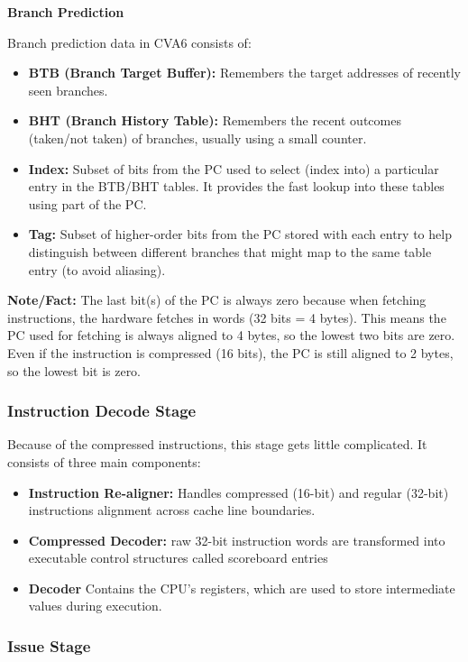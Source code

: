 \documentclass[12pt, a4paper]{article}
\begin{document}
\vspace{0.5em}

\textbf{Branch Prediction}

Branch prediction data in CVA6 consists of:
\begin{itemize}[nosep]
    \item \textbf{BTB (Branch Target Buffer):} Remembers the target addresses of recently seen branches.
    \item \textbf{BHT (Branch History Table):} Remembers the recent outcomes (taken/not taken) of branches, usually using a small counter.
    \item \textbf{Index:} Subset of bits from the PC used to select (index into) a particular entry in the BTB/BHT tables. It provides the fast lookup into these tables using part of the PC.
    \item \textbf{Tag:} Subset of higher-order bits from the PC stored with each entry to help distinguish between different branches that might map to the same table entry (to avoid aliasing).
\end{itemize}

\textbf{Note/Fact:} The last bit(s) of the PC is always zero because when fetching instructions, the hardware fetches in words (32 bits = 4 bytes). This means the PC used for fetching is always aligned to 4 bytes, so the lowest two bits are zero. 
Even if the instruction is compressed (16 bits), the PC is still aligned to 2 bytes, so the lowest bit is zero.

\subsubsection{Instruction Decode Stage}
Because of the compressed instructions, this stage gets little complicated. It consists of three main components:
\begin{itemize}[nosep]
    \item \textbf{Instruction Re-aligner:} Handles compressed (16-bit) and regular (32-bit) instructions alignment across cache line boundaries.
    \item \textbf{Compressed Decoder:} raw 32-bit instruction words are transformed into executable control structures called scoreboard entries
    \item \textbf{Decoder} Contains the CPU's registers, which are used to store intermediate values during execution.
\end{itemize}

\subsubsection{Issue Stage}
\end{document}
